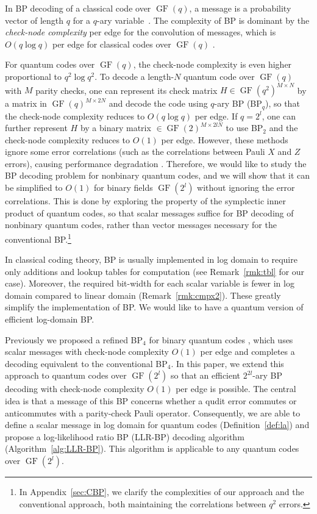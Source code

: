 \documentclass{ieeeaccess}
\DeclareMathOperator{\GF}{GF}
\let\emph\textit
\theoremstyle{definition}		%
\begin{document}
In BP decoding of a classical code over $\GF(q)$, a message is a probability vector of length $q$ for a $q$-ary variable~\cite{DM98}.
The complexity of BP is dominant by the \emph{check-node complexity} per edge for the convolution of messages,
which is $O(q\log q)$ per edge for classical codes over $\GF(q)$ \cite{MD01,DF07}.

For quantum codes over $\GF(q)$, the check-node complexity is even higher proportional to $q^2\log q^2$. 
	To decode a \mbox{length-$N$} quantum code over $\GF(q)$ with $M$ parity checks, one can represent its check matrix $H\in \GF(q^{2})^{M\times N}$ by a matrix in $\GF(q)^{M\times 2N}$ and decode the code using $q$-ary BP (BP$_q$), so that the check-node complexity reduces to $O(q\log q)$ per edge.
	If $q=2^l$, one can further represent $H$ by a binary matrix $\in\GF(2)^{M\times 2lN}$ to use BP$_2$ and the check-node complexity reduces to $O(1)$ per edge.
	However, these methods ignore some error correlations (such as the correlations between Pauli $X$ and $Z$ errors),
	causing performance degradation \cite{DT14,Bab+15,ROJ19,PK19,KL20}.
 Therefore, we would like to study the BP decoding problem for nonbinary quantum codes,
 and we will show that it can be simplified to $O(1)$ for binary fields $\GF(2^l)$ without ignoring the error correlations.
This is done by exploring the property of the symplectic inner product of quantum codes, so that  scalar messages suffice for BP decoding of nonbinary quantum codes, rather than  vector messages necessary for the conventional BP.\footnote{
	In Appendix~\ref{sec:CBP}, we clarify the complexities of our approach and the conventional approach, both maintaining the correlations between $q^2$ errors.}


	In classical coding theory, BP is usually implemented in log domain to require only additions and lookup tables for computation \cite{Gal63,WSM04,RVH95,HOP96,HEAD01} (see Remark~\ref{rmk:tbl} for our case). %
	Moreover, the required bit-width for each scalar variable is fewer in log domain compared to linear domain (Remark~\ref{rmk:cmpx2}). 
These greatly simplify the implementation of BP. 
We would like to have a quantum version of efficient log-domain BP.

 Previously we proposed a refined BP$_4$ for binary quantum codes \cite{KL20}, which uses scalar messages 
with check-node complexity $O(1)$ per edge and completes a decoding equivalent to the conventional BP$_4$.
%
In this paper, we extend this approach to quantum codes over $\GF(2^l)$ 
so that an efficient  $2^{2l}$-ary BP decoding with check-node complexity $O(1)$ per edge is possible.
The central idea is that a message of this BP concerns whether a qudit error commutes or anticommutes with a parity-check Pauli operator.  Consequently,  we are able to define a scalar message in log domain for quantum codes (Definition~\ref{def:la}) and propose a log-likelihood ratio BP \mbox{(LLR-BP)} decoding algorithm (Algorithm~\ref{alg:LLR-BP}). %
This algorithm is applicable to any quantum codes over $\GF(2^l)$.
\end{document}
